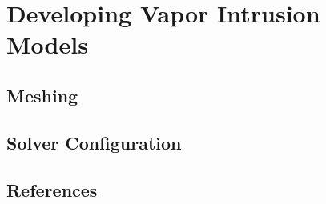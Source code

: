 \documentclass[../thesis.tex]{subfiles}
\begin{document}
\chapter{Developing Vapor Intrusion Models}








\section{Meshing}

\section{Solver Configuration}


\section{References}
\end{document}
